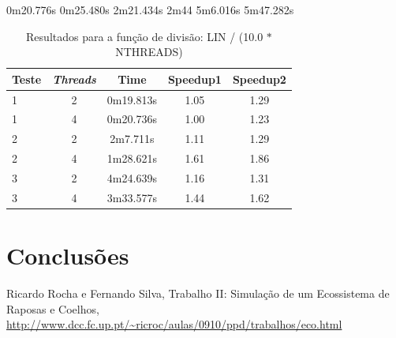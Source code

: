 \documentclass[12pt]{article}
\begin{document}
0m20.776s
0m25.480s
2m21.434s
2m44
5m6.016s
5m47.282s

\begin{table}[H]
    \begin{tabular}{ | l | c | c | c | c |}
      \hline
      \textbf{Teste} & \textbf{\textit{Threads}} & \textbf{Time} & \textbf{Speedup1} & \textbf{Speedup2}\\ \hline
      1 & 2 & 0m19.813s & 1.05 & 1.29 \\ \hline
      1 & 4 & 0m20.736s & 1.00 & 1.23 \\ \hline
      2 & 2 & 2m7.711s & 1.11 & 1.29 \\ \hline
      2 & 4 & 1m28.621s & 1.61 & 1.86 \\ \hline
      3 & 2 & 4m24.639s & 1.16 & 1.31 \\ \hline
      3 & 4 & 3m33.577s & 1.44 & 1.62 \\ \hline
  \end{tabular}
  \caption{Resultados para a função de divisão: LIN / (10.0 $*$ NTHREADS)}
  \label{tbl:resultados10}
\end{table}

\section{Conclusões}

\renewcommand{\bibname}{Referências}
\begin{thebibliography}{10}
  
	 Ricardo Rocha e Fernando Silva, Trabalho II: Simulação de um Ecossistema de Raposas e Coelhos, \url{http://www.dcc.fc.up.pt/~ricroc/aulas/0910/ppd/trabalhos/eco.html}
	
\end{thebibliography}


\end{document}
